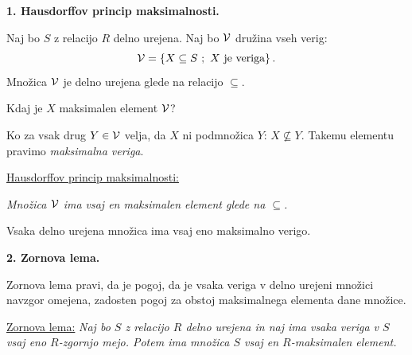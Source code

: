 \documentclass[11pt,paper=b5,footinclude,headinclude]{scrbook} %
\begin{document}
%
%
%
%

\bigskip
\textbf{1. Hausdorffov princip maksimalnosti.}

Naj bo $S$ z relacijo $R$ delno urejena. Naj bo ${\cal V}$ družina vseh verig:
$${\cal V} = \{X\subseteq S~;~X \textrm { je veriga}\}\,.$$
Množica ${\cal V}$ je delno urejena glede na relacijo $\subseteq$.

Kdaj je $X$ maksimalen element ${\cal V}$?

Ko za vsak drug $Y\in {\cal V}$ velja, da $X$ ni podmnožica $Y$: $X\nsubseteq Y$.
Takemu elementu pravimo {\em maksimalna veriga}.

\bigskip
\underline{Hausdorffov princip maksimalnosti:}

{\em Množica ${\cal V}$ ima vsaj en maksimalen element glede na $\subseteq$.}

Vsaka delno urejena množica ima vsaj eno maksimalno verigo.

\bigskip
\textbf{2. Zornova lema.}

Zornova lema pravi, da je pogoj, da je vsaka veriga v delno urejeni množici navzgor omejena,
zadosten pogoj za obstoj maksimalnega elementa dane množice.

\medskip
\underline{Zornova lema:} {\em Naj bo $S$ z relacijo $R$ delno urejena in naj ima vsaka veriga v $S$ vsaj eno
$R$-zgornjo mejo. Potem ima množica $S$ vsaj en $R$-maksimalen element.}
\end{document}
